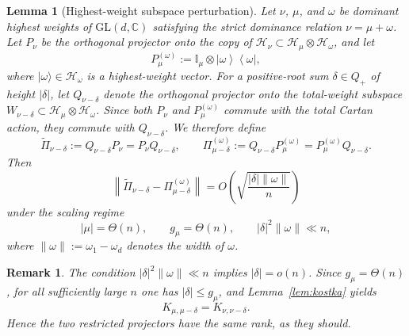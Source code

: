 \documentclass[a4paper,onecolumn,11pt]{quantumarticle}
\newtheorem{lem}{Lemma}
\newtheorem{rem}{Remark}
\newcommand{\ket}[1]{| #1 \rangle}
\newcommand{\ketbra}[2]{\left|#1\right\rangle\!\!\left\langle #2\right|}
\def\id{\mathbb{I}}
\begin{document}
\begin{lem}[Highest-weight subspace perturbation]\label{lem:perturbation}
Let \(\nu\), \(\mu\), and \(\omega\) be dominant highest weights of \(\mathrm{GL}(d,\mathbb C)\) satisfying the strict dominance relation $\nu=\mu+\omega$.
Let \(P_\nu\) be the orthogonal projector onto the copy of \(\mathcal H_\nu\subset \mathcal H_\mu\otimes\mathcal H_\omega\), and let
\[
P_\mu^{(\omega)}:=\id_\mu\otimes \ketbra{\omega}{\omega},
\]
where \(\ket{\omega}\in\mathcal H_\omega\) is a highest-weight vector.
For a positive-root sum \(\delta\in Q_+\) of height \(|\delta|\), let \(Q_{\nu-\delta}\) denote the orthogonal projector onto the total-weight subspace $W_{\nu-\delta}\subset \mathcal H_\mu\otimes \mathcal H_\omega$.
Since both \(P_\nu\) and \(P_\mu^{(\omega)}\) commute with the total Cartan action, they commute with \(Q_{\nu-\delta}\). We therefore define
\begin{equation}
    \widetilde{\Pi}_{\nu-\delta}:=Q_{\nu-\delta}P_\nu=P_\nu Q_{\nu-\delta},
    \qquad
    \Pi_{\mu-\delta}^{(\omega)}:=Q_{\nu-\delta}P_\mu^{(\omega)}=P_\mu^{(\omega)}Q_{\nu-\delta}.
\end{equation}
Then
\begin{equation}
    \left\|\widetilde{\Pi}_{\nu-\delta}-\Pi_{\mu-\delta}^{(\omega)}\right\|
    = O\!\left(\sqrt{\frac{|\delta| \|\omega\|}{n}}\right)
\end{equation}
under the scaling regime
\[
|\mu|=\Theta(n),\qquad g_\mu=\Theta(n),\qquad |\delta|^2\|\omega\|\ll n,
\]
where \(\|\omega\|:=\omega_1-\omega_d\) denotes the width of \(\omega\).
\end{lem}

\begin{rem}
The condition \(|\delta|^2\|\omega\|\ll n\) implies \(|\delta|=o(n)\). Since \(g_\mu=\Theta(n)\), for all sufficiently large \(n\) one has \(|\delta|\le g_\mu\), and Lemma~\ref{lem:kostka} yields
\[
K_{\mu,\mu-\delta}=K_{\nu,\nu-\delta}.
\]
Hence the two restricted projectors have the same rank, as they should.
\end{rem}
\end{document}

